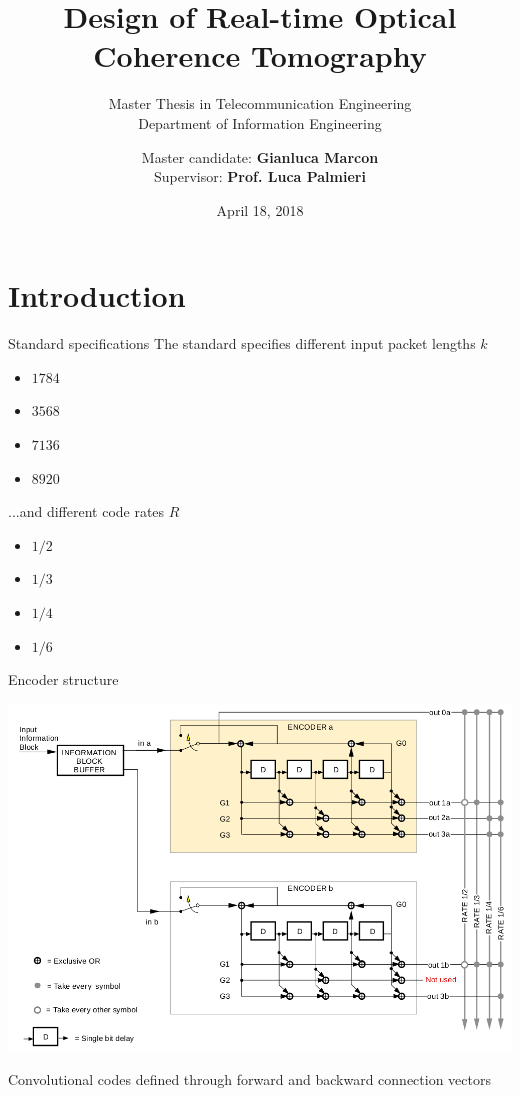 \documentclass[xcolor={usenames,dvipsnames},11pt]{beamer}
\title{ \LARGE Design of Real-time Optical Coherence Tomography}
\subtitle{Master Thesis in Telecommunication Engineering\\ Department of Information Engineering}
\author[G. Marcon]{Master candidate: \textbf{Gianluca Marcon} \\ Supervisor: \textbf{Prof. Luca Palmieri}}
\date{\vspace{0.5cm}\centering April 18, 2018\vspace*{-0.5cm}}
\begin{document}
\maketitle

\section{Introduction}
\begin{frame}{Standard specifications}
    The standard specifies different input packet lengths $k$
    \begin{itemize}
        \item $1784$
        \item $3568$
        \item $7136$
        \item $8920$
    \end{itemize}

    ...and different code rates $R$
    \begin{itemize}
        \item $1/2$
        \item $1/3$
        \item $1/4$
        \item $1/6$
    \end{itemize}    
\end{frame}
\begin{frame}{Encoder structure}
    \begin{center}
        \includegraphics[height=0.75\textheight]{./images/encoder-structure}
    \end{center}
    Convolutional codes defined through forward and backward connection vectors
\end{frame}
\end{document}
